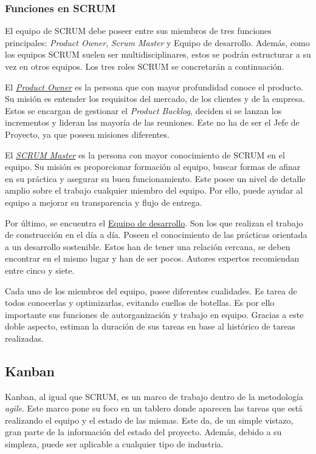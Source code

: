 \subsubsection{Funciones en SCRUM}
El equipo de SCRUM debe poseer entre sus miembros de tres funciones principales: \textit{Product Owner}, \textit{Scrum Master} y Equipo de desarrollo. Además, como los equipos SCRUM suelen ser multidisciplinares, estos se podrán estructurar a su vez en otros equipos. Los tres roles SCRUM se concretarán a continuación.

El \underline{\textit{Product Owner}} es la persona que con mayor profundidad conoce el producto. Su misión es entender los requisitos del mercado, de los clientes y de la empresa. Estos se encargan de gestionar el \textit{Product Backlog}, deciden si se lanzan los incrementos y lideran las mayoría de las reuniones. Este no ha de ser el Jefe de Proyecto, ya que poseen misiones diferentes.

El \underline{\textit{SCRUM Master}} es la persona con mayor conocimiento de SCRUM en el equipo. Su misión es proporcionar formación al equipo, buscar formas de afinar en su práctica y asegurar su buen funcionamiento. Este posee un nivel de detalle amplio sobre el trabajo cualquier miembro del equipo. Por ello, puede ayudar al equipo a mejorar su transparencia y flujo de entrega.

Por último, se encuentra el \underline{Equipo de desarrollo}. Son los que realizan el trabajo de construcción en el día a día. Poseen el conocimiento de las prácticas orientada a un desarrollo sostenible. Estos han de tener una relación cercana, se deben encontrar en el mismo lugar y han de ser pocos. Autores expertos recomiendan entre cinco y siete.

Cada uno de los miembros del equipo, posee diferentes cualidades. Es tarea de todos conocerlas y optimizarlas, evitando cuellos de botellas. Es por ello importante sus funciones de autorganización y trabajo en equipo. Gracias a este doble aspecto, estiman la duración de sus tareas en base al histórico de tareas realizadas.


\subsection{Kanban}
Kanban, al igual que SCRUM, es un marco de trabajo dentro de la metodología \textit{agile}. Este marco pone su foco en un tablero donde aparecen las tareas que está realizando el equipo y el estado de las mismas. Este da, de un simple vistazo, gran parte de la información del estado del proyecto. Además, debido a su simpleza, puede ser aplicable a cualquier tipo de industria.

